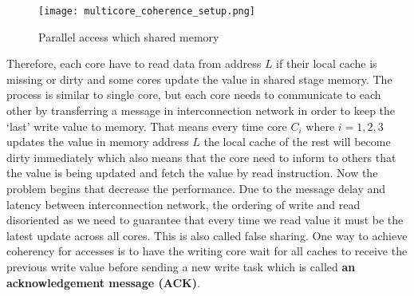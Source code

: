 \begin{figure}[h]
        \centering
        \texttt{[image: multicore\_coherence\_setup.png]}
        \caption{\label{fig:multicore_setup} Parallel access which shared memory}
\end{figure}

Therefore, each core have to read data from address $L$ if their local cache is missing or dirty and some cores
update the value in shared stage memory. The process is similar to single core, but each core needs to communicate
to each other by transferring a message in interconnection network in order to keep the `last' write value to memory.
That means every time core $C_i$ where $i = 1,2,3$ updates the value in memory address $L$ the local cache of the rest 
will become dirty immediately which also means that the core need to inform to others that the value is being updated 
and fetch the value by read instruction. Now the problem begins that decrease the performance. Due to the message delay and latency
between interconnection network, the ordering of write and read disoriented as we need to guarantee that every time we read value
it must be the latest update across all cores. This is also called false sharing. One way to achieve coherency for accesses is to have the writing core wait for all caches
to receive the previous write value before sending a new write task which is called \textbf{an acknowledgement message (ACK)}.

